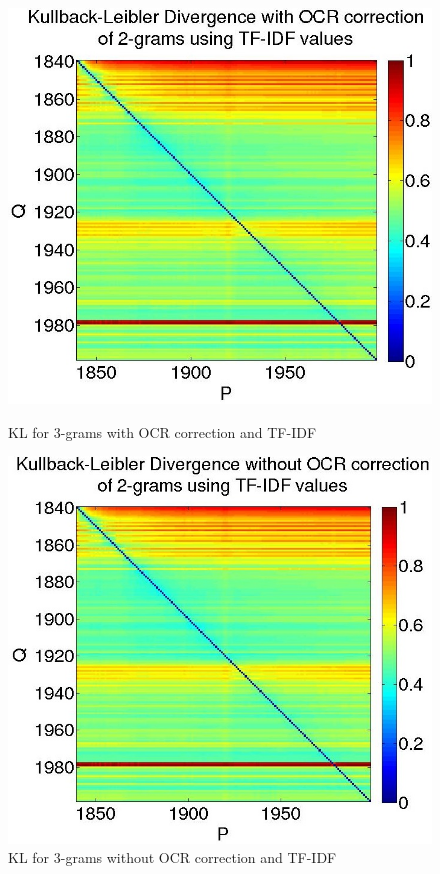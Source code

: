 \begin{figure}[H]
    \begin{minipage}[b]{0.48\linewidth}
        \includegraphics[scale=0.25]{Pictures/kullback-leibler/KL_2-grams_with_correction_tfidf.jpg}
        \caption{KL for 3-grams with OCR correction and TF-IDF}
        \label{KL-TC3}
    \end{minipage}\hfill
    \begin{minipage}[b]{0.5\linewidth}
        \includegraphics[scale=0.25]{Pictures/kullback-leibler/KL_2-grams_without_correction_tfidf.jpg}
        \caption{KL for 3-grams without OCR correction and TF-IDF}
        \label{KL-TN3}
    \end{minipage}\hfill
\end{figure}

